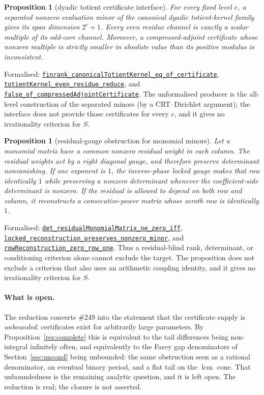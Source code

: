 \documentclass[11pt]{article}
\newcommand{\commit}{81150c1c6fdd4cd51e76d3aa0de344341e0e9e7c}
\newcommand{\repobase}{https://github.com/wcook04/plectis-lean-erdos249-257/blob/\commit}
\newcommand{\PK}{Erdos249257}
\newcommand{\lrefx}[3]{\href{\repobase/\PK/#1\#L#2}{\nolinkurl{#3}}}
\newtheorem{proposition}[theorem]{Proposition}
\theoremstyle{definition}
\theoremstyle{remark}
\newcommand{\lcm}{\operatorname{lcm}}
\begin{document}
\begin{proposition}[dyadic totient certificate interface]\label{res:dyadictotient}
For every fixed level $e$, a separated nonzero evaluation minor of the
canonical dyadic totient-kernel family gives its span dimension
$2^e+1$.  Every even residue channel is exactly a scalar multiple of its
odd-core channel.  Moreover, a compressed-adjoint certificate whose nonzero
multiple is strictly smaller in absolute value than its positive modulus is
inconsistent.
\end{proposition}
\noindent Formalised:
\lrefx{TotientMahlerDefect.lean}{98}{finrank_canonicalTotientKernel_eq_of_certificate},
\lrefx{TotientMahlerDefect.lean}{156}{totientKernel_even_residue_reduce}, and
\lrefx{TotientMahlerDefect.lean}{197}{false_of_compressedAdjointCertificate}.
The unformalised producer is the all-level construction of the separated
minors (by a CRT--Dirichlet argument); the interface does not provide those
certificates for every $e$, and it gives no irrationality criterion for $S$.

\begin{proposition}[residual-gauge obstruction for monomial minors]\label{res:residualgauge}
Let a monomial matrix have a common nonzero residual weight in each column.
The residual weights act by a right diagonal gauge, and therefore preserve
determinant nonvanishing.  If one exponent is $1$, the inverse-phase locked
gauge makes that row identically $1$ while preserving a nonzero determinant
whenever the coefficient-side determinant is nonzero.  If the residual is
allowed to depend on both row and column, it reconstructs a consecutive-power
matrix whose zeroth row is identically $1$.
\end{proposition}
\noindent Formalised:
\lrefx{ResidualGaugeObstruction.lean}{55}{det_residualMonomialMatrix_ne_zero_iff},
\lrefx{ResidualGaugeObstruction.lean}{94}{locked_reconstruction_preserves_nonzero_minor}, and
\lrefx{ResidualGaugeObstruction.lean}{145}{rowReconstruction_zero_row_one}.
Thus a residual-blind rank, determinant, or conditioning criterion alone cannot
exclude the target.  The proposition does not exclude a criterion that also
uses an arithmetic coupling identity, and it gives no irrationality criterion
for $S$.

\paragraph{What is open.} The reduction converts \#249 into the statement that the
certificate supply is \emph{unbounded}: certificates exist for arbitrarily large
parameters. By Proposition~\ref{res:complete} this is equivalent to the
tail differences being non-integral infinitely often, and equivalently to the
Farey gap denominators of Section~\ref{sec:uncond} being unbounded: the same
obstruction seen as a rational denominator, an eventual binary period, and a flat
tail on the $\lcm$ cone. That unboundedness is the remaining analytic question,
and it is left open. The reduction is real; the closure is not asserted.
\end{document}
